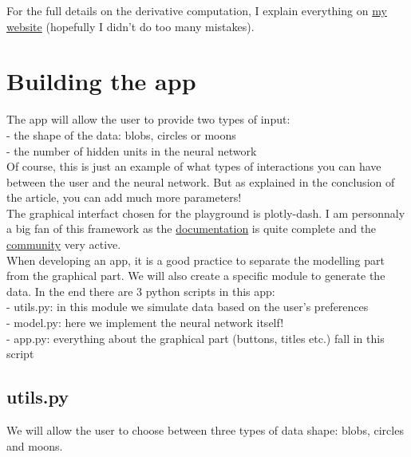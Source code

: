For the full details on the derivative computation, I explain everything on \href{https://savoga.github.io/machinelearning/neural-network/}{my website} (hopefully I didn't do too many mistakes).

\section{Building the app}

The app will allow the user to provide two types of input: \\

- the shape of the data: blobs, circles or moons \\

- the number of hidden units in the neural network \\

Of course, this is just an example of what types of interactions you can have between the user and the neural network. But as explained in the conclusion of the article, you can add much more parameters! \\

The graphical interfact chosen for the playground is plotly-dash. I am personnaly a big fan of this framework as the \href{https://dash.plotly.com/}{documentation} is quite complete and the \href{https://community.plotly.com/c/dash/16}{community} very active. \\

When developing an app, it is a good practice to separate the modelling part from the graphical part. We will also create a specific module to generate the data. In the end there are 3 python scripts in this app: \\

- utils.py: in this module we simulate data based on the user's preferences \\

- model.py: here we implement the neural network itself! \\

- app.py: everything about the graphical part (buttons, titles etc.) fall in this script \\

\subsection{utils.py}

We will allow the user to choose between three types of data shape: blobs, circles and moons. \\

